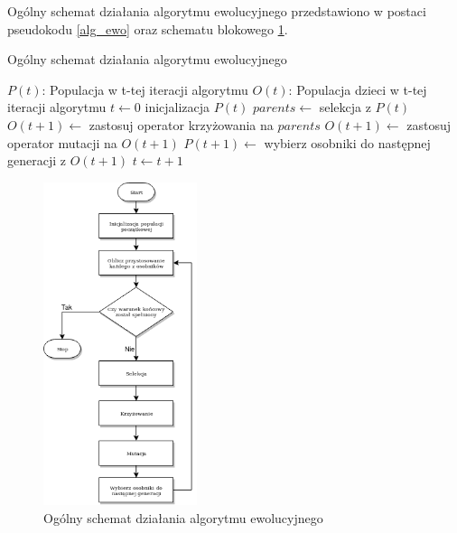 Ogólny schemat działania algorytmu ewolucyjnego przedstawiono w postaci pseudokodu \ref{alg_ewo} oraz schematu blokowego \ref{alg_ewo_img}.

\begin{pseudokod}[H]
\caption{Ogólny schemat działania algorytmu ewolucyjnego}
\label{alg_ewo}
    $P(t)$: Populacja w t-tej iteracji algorytmu\;
    $O(t)$: Populacja dzieci w t-tej iteracji algorytmu\;
    \BlankLine
    $t \gets 0$\;
    inicjalizacja $P(t)$\;
    \BlankLine
     {
        $parents \gets$ selekcja z $P(t)$\;
        $O(t+1) \gets$ zastosuj operator krzyżowania na $parents$\;
        $O(t+1) \gets$ zastosuj operator mutacji na $O(t+1)$\;
        $P(t+1) \gets$ wybierz osobniki do następnej generacji z $O(t+1)$\;
        $t \gets t+1$\;
    }
    \;
\end{pseudokod}

\begin{figure}[H]
    \centering        
    \includegraphics[width=0.4\textwidth]{img/alg_ewo_szkic.png}
    \caption{Ogólny schemat działania algorytmu ewolucyjnego}
    \label{alg_ewo_img}
\end{figure}

